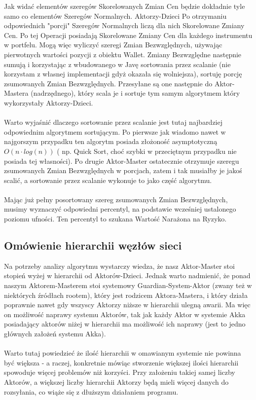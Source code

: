 \documentclass[11pt,titlepage]{article}
\begin{document}
Jak widać elementów szeregów Skorelowanych Zmian Cen będzie dokładnie tyle samo co elementów Szeregów Normalnych. Aktorzy-Dzieci Po otrzymaniu odpowiednich "porcji" Szeregów Normalnych liczą dla nich Skorelowane Zmiany Cen. Po tej Operacji posiadają Skorelowane Zmiany Cen dla każdego instrumentu w portfelu. Mogą więc wyliczyć szeregi Zmian Bezwzględnych, używając pierwotnych wartości pozycji z obiektu Wallet. Zmiany Bezwzględne następnie sumują i korzystając z wbudowanego w Javę sortowania przez scalanie (nie korzystam z własnej implementacji gdyż okazała się wolniejsza), sortuję porcję zsumowanych Zmian Bezwzględnych. Przesyłane są one następnie do Aktor-Mastera (nadrzędnego), który scala je i sortuje tym samym algorytmem który wykorzystały Aktorzy-Dzieci. \\
\\
Warto wyjaśnić dlaczego sortowanie przez scalanie jest tutaj najbardziej odpowiednim algorytmem sortującym. Po pierwsze jak wiadomo nawet w najgorszym przypadku ten algorytm posiada złożoność asymptotyczną $ O (n \cdot log(n)) $ ( np. Quick Sort, choć szybki w przeciętnym przypadku nie posiada tej własności). Po drugie Aktor-Master ostatecznie otrzymuje szeregu zsumowanych Zmian Bezwzględnych w porcjach, zatem i tak musiałby je jakoś scalić, a sortowanie przez scalanie wykonuje to jako część algorytmu.\\
\\
Mając już pełny posortowany szereg zsumowanych Zmian Bezwzględnych, musimy wyznaczyć odpowiedni percentyl, na podstawie wcześniej ustalonego poziomu ufności. Ten percentyl to szukana Wartość Narażona na Ryzyko.



\subsection{Omówienie hierarchii węzłów sieci}

Na potrzeby analizy algorytmu wystarczy wiedza, że nasz Aktor-Master stoi stopień wyżej w hierarchii od Aktorów-Dzieci. Jednak warto nadmienić, że ponad naszym Aktorem-Masterem stoi systemowy Guardian-System-Aktor (zwany też w niektórych źródłach rootem), który jest rodzicem Aktora-Mastera, i który działa poprawnie nawet gdy wszyscy Aktorzy niższe w hierarchii ulegną awarii. Ma więc on możliwość naprawy systemu Aktorów, tak jak każdy Aktor w systemie Akka posiadający aktorów niżej w hierarchii ma możliwość ich naprawy (jest to jedno głównych założeń systemu Akka). \\
\\
Warto tutaj powiedzieć że ilość hierarchii w omawianym systemie nie powinna być większa - a raczej, konkretnie mówiąc stworzenie większej ilości hierarchii spowoduje więcej problemów niż korzyści. Przy założeniu takiej samej liczby Aktorów, a większej liczby hierarchii Aktorzy będą mieli więcej danych do rozsyłania, co wiąże się z dłuższym działaniem programu.
\end{document}
